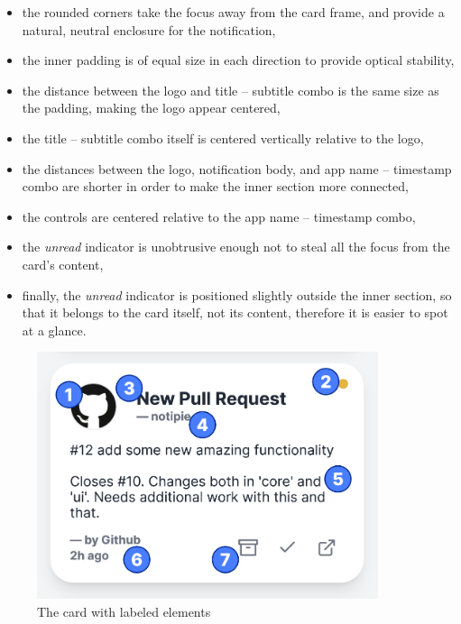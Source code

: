 \begin{itemize}
      \item
            the rounded corners take the focus away from the card frame,
            and provide a natural, neutral enclosure for the notification,
      \item
            the inner padding is of equal size in each direction
            to provide optical stability,
      \item
            the distance between the logo and title -- subtitle combo
            is the same size as the padding,
            making the logo appear centered,
      \item
            the title -- subtitle combo itself
            is centered vertically relative to the logo,
      \item
            the distances between the logo,
            notification body, and app name -- timestamp combo are shorter
            in order to make the inner section more connected,
      \item
            the controls are centered relative to the app name -- timestamp combo,
      \item
            the \textit{unread} indicator is unobtrusive enough
            not to steal all the focus from the card's content,
      \item
            finally, the \textit{unread} indicator
            is positioned slightly outside the inner section,
            so that it belongs to the card itself,
            not its content,
            therefore it is easier to spot at a glance.
\end{itemize}

\begin{figure}[p]
      \centering
      \includegraphics[width=10cm,keepaspectratio]{img/card_labeled.png}
      \caption{The card with labeled elements}
      \label{fig:card-with-labeled-elements}
\end{figure}

